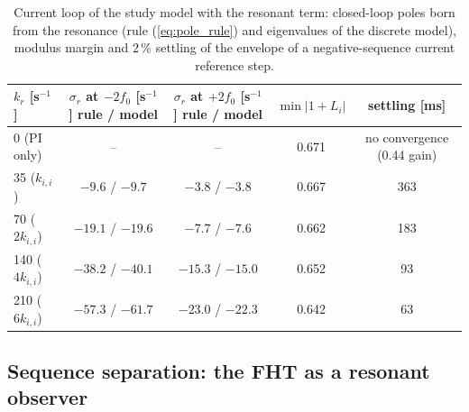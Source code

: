 \documentclass[10pt,a4paper]{scrartcl}
\newcommand{\kii}{k_{i,i}}
\begin{document}
\begin{onehalfspace}
\begin{table}[htb]
\centering\small\setlength{\tabcolsep}{4pt}
\caption{Current loop of the study model with the resonant term: closed-loop poles born from the resonance (rule (\ref{eq:pole_rule}) and eigenvalues of the discrete model), modulus margin and 2\,\% settling of the envelope of a negative-sequence current reference step.}
\label{tab:kr}
\begin{tabular}{@{}lcccc@{}}
\toprule
$k_r$ [s$^{-1}$] & \makecell{$\sigma_r$ at $-2f_0$ [s$^{-1}$] \\ rule / model} & \makecell{$\sigma_r$ at $+2f_0$ [s$^{-1}$] \\ rule / model} & $\min|1+L_i|$ & settling [ms] \\
\midrule
0 (PI only) & -- & -- & 0.671 & no convergence (0.44 gain) \\
35 ($\kii$) & $-9.6$ / $-9.7$ & $-3.8$ / $-3.8$ & 0.667 & 363 \\
70 ($2\kii$) & $-19.1$ / $-19.6$ & $-7.7$ / $-7.6$ & 0.662 & 183 \\
140 ($4\kii$) & $-38.2$ / $-40.1$ & $-15.3$ / $-15.0$ & 0.652 & 93 \\
210 ($6\kii$) & $-57.3$ / $-61.7$ & $-23.0$ / $-22.3$ & 0.642 & 63 \\
\bottomrule
\end{tabular}
\end{table}

\subsection{Sequence separation: the FHT as a resonant observer}
\label{sec:fht}


\end{onehalfspace}
\end{document}
